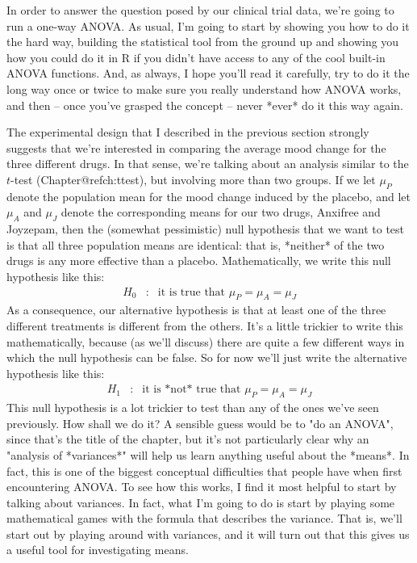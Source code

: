 In order to answer the question posed by our clinical trial data, we're going to run a one-way ANOVA. As usual, I'm going to start by showing you how to do it the hard way, building the statistical tool from the ground up and showing you how you could do it in R if you didn't have access to any of the cool built-in ANOVA functions. And, as always, I hope you'll read it carefully, try to do it the long way once or twice to make sure you really understand how ANOVA works, and then -- once you've grasped the concept -- never *ever* do it this way again.

The experimental design that I described in the previous section strongly suggests that we're interested in comparing the average mood change for the three different drugs. In that sense, we're talking about an analysis similar to the $t$-test (Chapter@refch:ttest), but involving more than two groups. If we let $\mu_P$ denote the population mean for the mood change induced by the placebo, and let $\mu_A$ and $\mu_J$ denote the corresponding means for our two drugs, Anxifree and Joyzepam, then the (somewhat pessimistic) null hypothesis that we want to test is that all three population means are identical: that is, *neither* of the two drugs is any more effective than a placebo. Mathematically, we write this null hypothesis like this:
$$
\begin{array}{rcl}
H_0 &:& \mbox{it is true that } \mu_P = \mu_A = \mu_J
\end{array}
$$
As a consequence, our alternative hypothesis is that at least one of the three different treatments is different from the others. It's a little trickier to write this mathematically, because (as we'll discuss) there are quite a few different ways in which the null hypothesis can be false. So for now we'll just write the alternative hypothesis like this:
$$
\begin{array}{rcl}
H_1 &:& \mbox{it is *not* true that } \mu_P = \mu_A = \mu_J
\end{array}
$$
This null hypothesis is a lot trickier to test than any of the ones we've seen previously. How shall we do it? A sensible guess would be to "do an ANOVA", since that's the title of the chapter, but it's not particularly clear why an "analysis of *variances*" will help us learn anything useful about the *means*. In fact, this is one of the biggest conceptual difficulties that people have when first encountering ANOVA. To see how this works, I find it most helpful to start by talking about variances. In fact, what I'm going to do is start by playing some mathematical games with the formula that describes the variance. That is, we'll start out by playing around with variances, and it will turn out that this gives us a useful tool for investigating means.


